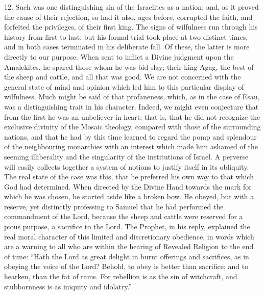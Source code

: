 12. Such was one distinguishing sin of the Israelites as a nation;
and, as it proved the cause of their rejection, so had it also, ages
before, corrupted the faith, and forfeited the privileges, of their
first king. The signs of wilfulness run through his history from first
to last: but his formal trial took place at two distinct times, and in
both cases terminated in his deliberate fall. Of these, the latter is
more directly to our purpose. When sent to inflict a Divine judgment
upon the Amalekites, he spared those whom he was bid slay; their king
Agag, the best of the sheep and cattle, and all that was good. We are
not concerned with the general state of mind and opinion which led him
to this particular display of wilfulness. Much might be said of that
profaneness, which, as in the case of Esau, was a distinguishing trait
in his character. Indeed, we might even conjecture that from the first
he was an unbeliever in heart; that is, that he did not recognize the
exclusive divinity of the Mosaic theology, compared with those of the
surrounding nations, and that he had by this time learned to regard
the pomp and splendour of the neighbouring monarchies with an interest
which made him ashamed of the seeming illiberality and the singularity
of the institutions of Israel. A perverse will easily collects
together a system of notions to justify itself in its obliquity. The
real state of the case was this, that he preferred his own way to that
which God had determined. When directed by the Divine Hand towards the
mark for which he was chosen, he started aside like a broken bow. He
obeyed, but with a reserve, yet distinctly professing to Samuel that
he had performed the commandment of the Lord, because the sheep and
cattle were reserved for a pious purpose, a sacrifice to the Lord. The
Prophet, in his reply, explained the real moral character of this
limited and discretionary obedience, in words which are a warning to
all who are within the hearing of Revealed Religion to the end of
time: ``Hath the Lord as great delight in burnt offerings and
sacrifices, as in obeying the voice of the Lord? Behold, to obey is
better than sacrifice; and to hearken, than the fat of rams. For
rebellion is as the sin of witchcraft, and stubbornness is as iniquity
and idolatry.''

